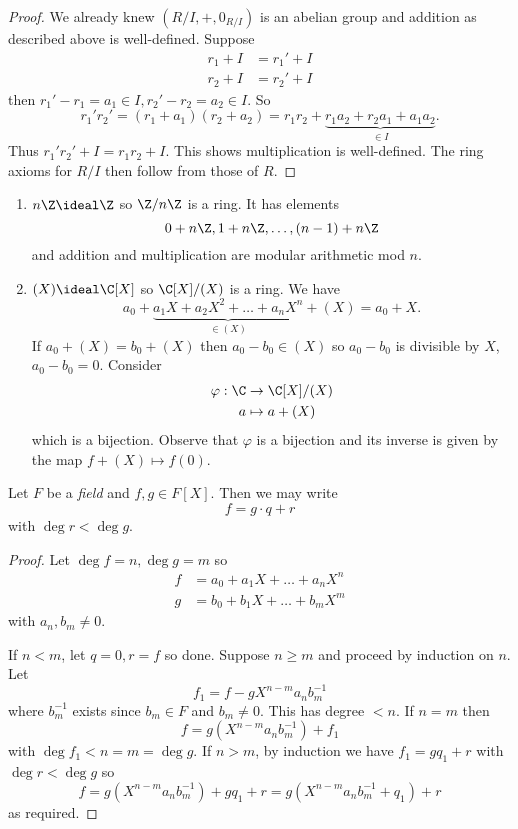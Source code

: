 \documentclass[a4paper]{article}
\theoremstyle{definition}
\begin{document}
\begin{proof}
  We already knew \((R/I, +, 0_{R/I})\) is an abelian group and addition as described above is well-defined. Suppose
  \begin{align*}
    r_1 + I &= r_1' + I \\
    r_2 + I &= r_2' + I
  \end{align*}
  then \(r_1' - r_1 = a_1 \in I, r_2' - r_2 = a_2 \in I\). So
  \[
    r_1'r_2' = (r_1 + a_1)(r_2 + a_2) = r_1r_2 + \underbrace{r_1a_2 + r_2a_1 + a_1a_2}_{\in I}.
  \]
  Thus \(r_1'r_2' + I = r_1r_2 + I\). This shows multiplication is well-defined. The ring axioms for \(R/I\) then follow from those of \(R\).
\end{proof}

\begin{eg}\leavevmode
  \begin{enumerate}
  \item \(n\Z \ideal \Z\) so \(\Z/n\Z\) is a ring. It has elements
    \[
      0 + n\Z, 1 + n\Z, \dots, (n - 1) + n\Z
    \]
    and addition and multiplication are modular arithmetic mod \(n\).
  \item \((X) \ideal \C[X]\) so \(\C[X]/(X)\) is a ring. We have
    \[
      a_0 + \underbrace{a_1X + a_2X^2 + \dots + a_nX^n}_{\in (X)} + (X) = a_0 + X.
    \]
    If \(a_0 + (X) = b_0 + (X)\) then \(a_0 - b_0 \in (X)\) so \(a_0 - b_0\) is divisible by \(X\), \(a_0 - b_0 = 0\). Consider
    \begin{align*}
      \varphi: \C &\to \C[X]/(X) \\
      a &\mapsto a + (X)
    \end{align*}
    which is a bijection. Observe that \(\varphi\) is a bijection and its inverse is given by the map \(f + (X) \mapsto f(0)\).
  \end{enumerate}
\end{eg}

\begin{proposition}
  \label{prop:polynomial euclidean}
  Let \(F\) be a \emph{field} and \(f, g \in F[X]\). Then we may write
  \[
    f = g \cdot q + r
  \]
  with \(\deg r < \deg g\).
\end{proposition}

\begin{proof}
  Let \(\deg f = n, \deg g = m\) so
  \begin{align*}
    f &= a_0 + a_1X + \dots + a_nX^n \\
    g &= b_0 + b_1X + \dots + b_mX^m
  \end{align*}
  with \(a_n, b_m \neq 0\).

  If \(n < m\), let \(q = 0, r = f\) so done. Suppose \(n \geq m\) and proceed by induction on \(n\). Let
  \[
    f_1 = f - gX^{n - m} a_nb_m^{-1}
  \]
  where \(b_m^{-1}\) exists since \(b_m \in F\) and \(b_m \neq 0\). This has degree \(< n\). If \(n = m\) then
  \[
    f = g(X^{n - m}a_nb_m^{-1}) + f_1
  \]
  with \(\deg f_1 < n = m = \deg g\). If \(n > m\), by induction we have \(f_1 = gq_1 + r\) with \(\deg r < \deg g\) so
  \[
    f = g(X^{n - m}a_nb_m^{-1}) + gq_1 + r = g(X^{n - m}a_nb_m^{-1} + q_1) + r
  \]
  as required.
\end{proof}
\end{document}

